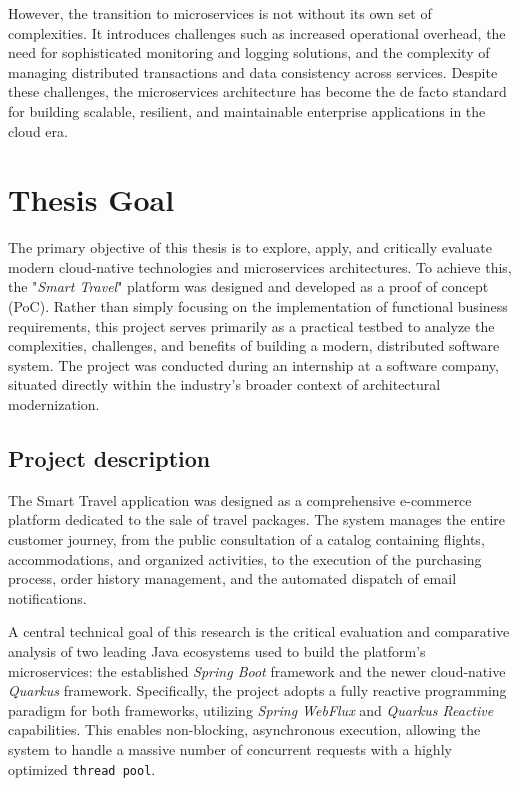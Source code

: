 However, the transition to microservices is not without its own set of complexities. It introduces challenges such as increased operational overhead, the need for sophisticated monitoring and logging solutions, and the complexity of managing distributed transactions and data consistency across services. Despite these challenges, the microservices architecture has become the de facto standard for building scalable, resilient, and maintainable enterprise applications in the cloud era.
 

\section[Thesis Goal]{Thesis Goal}

The primary objective of this thesis is to explore, apply, and critically evaluate modern cloud-native technologies and microservices architectures. To achieve this, the "\textit{Smart Travel}" platform was designed and developed as a proof of concept (\gls{PoC}). Rather than simply focusing on the implementation of functional business requirements, this project serves primarily as a practical testbed to analyze the complexities, challenges, and benefits of building a modern, distributed software system. The project was conducted during an internship at a software company, situated directly within the industry's broader context of architectural modernization. 

\subsection[Project description]{Project description}

The Smart Travel application was designed as a comprehensive e-commerce platform dedicated to the sale of travel packages. The system manages the entire customer journey, from the public consultation of a catalog containing flights, accommodations, and organized activities, to the execution of the purchasing process, order history management, and the automated dispatch of email notifications.

A central technical goal of this research is the critical evaluation and comparative analysis of two leading Java ecosystems used to build the platform's microservices: the established \textit{Spring Boot} framework and the newer cloud-native \textit{Quarkus} framework. Specifically, the project adopts a fully reactive programming paradigm for both frameworks, utilizing \textit{Spring WebFlux} and \textit{Quarkus Reactive} capabilities. This enables non-blocking, asynchronous execution, allowing the system to handle a massive number of concurrent requests with a highly optimized \texttt{thread pool}.


